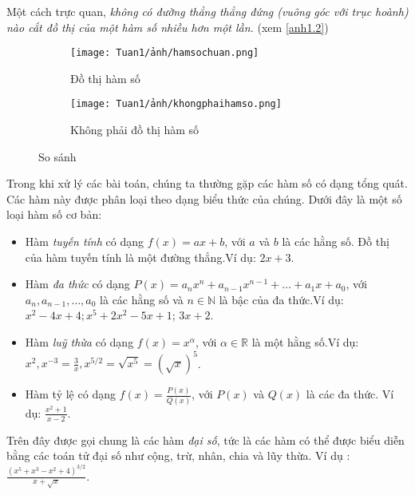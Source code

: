 Một cách trực quan,\emph{ không có đường thẳng thẳng đứng (vuông góc với trục hoành) nào cắt đồ thị của một hàm số nhiều hơn một lần.} (xem \ref{anh1.2})
\begin{figure}[htbp]
    \centering
    \begin{subfigure}{0.4\textwidth}
        \centering
        \texttt{[image: Tuan1/ảnh/hamsochuan.png]}
        \caption{Đồ thị hàm số}
    \end{subfigure}
    \hfill
    \begin{subfigure}{0.5\textwidth}
        \centering
        \texttt{[image: Tuan1/ảnh/khongphaihamso.png]}
        \caption{Không phải đồ thị hàm số}
    \end{subfigure}
    \caption{So sánh}\label{anh1.3}
    \end{figure}

\vspace{8pt}
Trong khi xử lý các bài toán, chúng ta thường gặp các hàm số có dạng tổng quát. Các hàm này được phân loại theo dạng biểu thức của chúng. Dưới đây là một số loại hàm số cơ bản:   \begin{itemize}
    \item Hàm \emph{tuyến tính} có dạng $f(x) = ax + b$, với $a$ và $b$ là các hằng số. Đồ thị của hàm tuyến tính là một đường thẳng.\newline Ví dụ: $ 2x+3$.
    \item Hàm \emph{đa thức} có dạng $P(x) = a_n x^n + a_{n-1} x^{n-1} + \ldots + a_1 x + a_0$, với $a_n, a_{n-1}, \ldots, a_0$ là các hằng số và $n\in\mathbb{N}$ là bậc của đa thức.\newline Ví dụ: $x^2 - 4x + 4; x^5 + 2x^2 - 5x + 1$; $3x+2$.
    \item Hàm \emph{luỹ thừa} có dạng $f(x)=x^\alpha$, với $\alpha\in\mathbb{R}$ là một hằng số.\newline Ví dụ: $x^2, x^{-3}=\frac{3}{x}, x^{5/2}=\sqrt{x^5}=(\sqrt x)^5$.     
    \item Hàm tỷ lệ có dạng $f(x) = \frac{P(x)}{Q(x)}$, với $P(x)$ và $Q(x)$ là các đa thức. Ví dụ: $\frac{x^2+1}{x-2}$.    
\end{itemize}
Trên đây được gọi chung là các hàm \emph{đại số}, tức là các hàm có thể được biểu diễn bằng các toán tử đại số như cộng, trừ, nhân, chia và lũy thừa.\newline
Ví dụ : $\frac{\left(x^5+x^3-x^2+4\right)^{3/2}}{x+\sqrt x}$.
\vspace{8pt}

